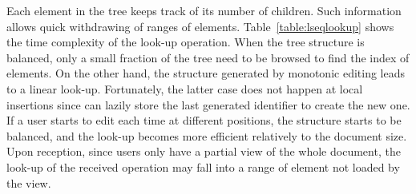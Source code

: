 %   

Each element in the tree keeps track of its number of children. Such information
allows quick withdrawing of ranges of elements. Table~\ref{table:lseqlookup}
shows the time complexity of the look-up operation. When the tree structure is
balanced, only a small fraction of the tree need to be browsed to find the index
of elements. On the other hand, the structure generated by monotonic editing
leads to a linear look-up. Fortunately, the latter case does not happen at local
insertions since \CRATE can lazily store the last generated identifier to create
the new one. If a user starts to edit each time at different positions, the
structure starts to be balanced, and the look-up becomes more efficient
relatively to the document size. Upon reception, since users only have a partial
view of the whole document, the look-up of the received operation may fall into
a range of element not loaded by the view.


